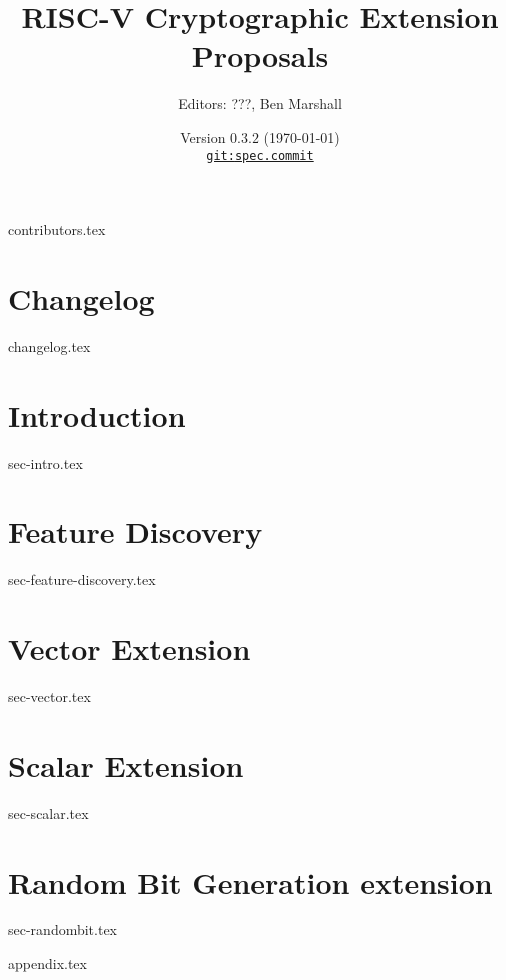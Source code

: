 \documentclass[11pt]{article}
\title{RISC-V Cryptographic Extension Proposals}
\author{Editors: ???, Ben Marshall}
\date{Version $0.3.2$ (\today) \\
\href{https://github.com/scarv/riscv-crypto}{
{\small \tt git:{spec.commit}}}
}
\begin{document}

\maketitle

{contributors.tex}

\tableofcontents


\newpage
\section{Changelog}
\label{sec:changelog}
{changelog.tex}


\newpage
\section{Introduction}
\label{sec:intro}
{sec-intro.tex}

\newpage
\section{Feature Discovery}
\label{sec:feature-discovery}
{sec-feature-discovery.tex}

\newpage
\section{Vector Extension}
\label{sec:vector}
{sec-vector.tex}

\newpage
\section{Scalar Extension}
\label{sec:scalar}
{sec-scalar.tex}

\newpage
\section{Random Bit Generation extension}
\label{sec:randombit}
{sec-randombit.tex}


\newpage
\printbibliography


%
%

\newpage
\begin{appendices}
\label{sec:appendix}
{appendix.tex}
\end{appendices}

\end{document}
